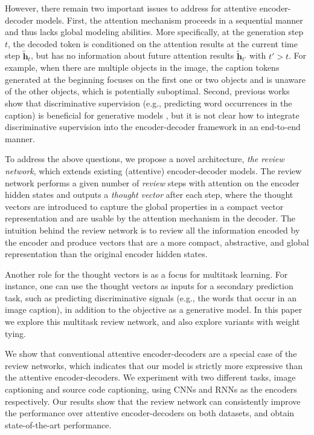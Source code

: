 \documentclass{article}
\begin{document}
However, there remain two important issues to address for attentive encoder-decoder models. First, the attention mechanism proceeds in a sequential manner and thus lacks global modeling abilities. More specifically, at the generation step $t$, the decoded token is conditioned on the attention results at the current time step $\tilde{\mathbf{h}}_t$, but has no information about future attention results $\tilde{\mathbf{h}}_{t'}$ with $t' > t$. For example, when there are multiple objects in the image, the caption tokens generated at the beginning focuses on the first one or two objects and is unaware of the other objects, which is potentially suboptimal. Second, previous works show that discriminative supervision (e.g., predicting word occurrences in the caption) is beneficial for generative models \cite{fang2015captions}, but it is not clear how to integrate discriminative supervision into the encoder-decoder framework in an end-to-end manner.

To address the above questions, we propose a novel architecture, \textit{the review network}, which extends existing (attentive) encoder-decoder models. The review network performs a given number of \textit{review} steps with attention on the encoder hidden states and outputs a \textit{thought vector} after each step, where the thought vectors are introduced to capture the global properties in a compact vector representation and are usable by the attention mechanism in the decoder.
The intuition behind the review network is to review all the information encoded by the encoder and produce vectors that are a more compact, abstractive, and global representation than the original encoder hidden states.

Another role for the thought vectors is as a focus for multitask learning. For instance, one can use the thought vectors as inputs for a secondary prediction task, such as predicting discriminative signals (e.g., the words that occur in an image caption), in addition to the objective as a generative model. In this paper we explore this multitask review network, and also explore variants with weight tying.


We show that conventional attentive encoder-decoders are a special case of the review networks, which indicates that our model is strictly more expressive than the attentive encoder-decoders. We experiment with two different tasks, image captioning and source code captioning, using CNNs and RNNs as the encoders respectively. Our results show that the review network can consistently improve the performance over attentive encoder-decoders on both datasets, and obtain state-of-the-art performance.
\end{document}
